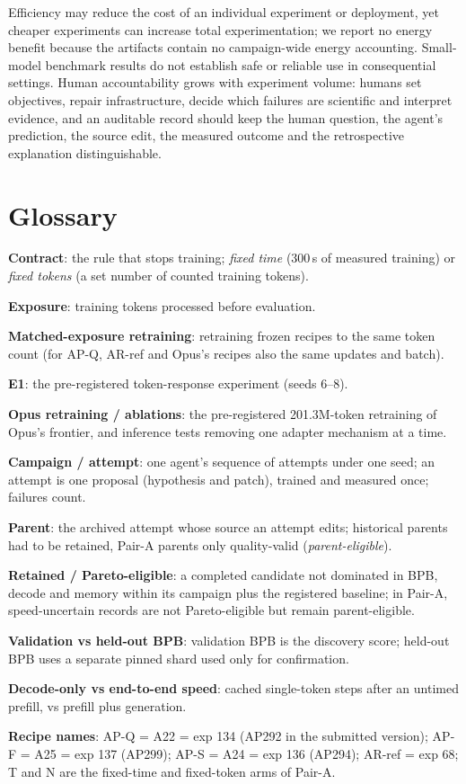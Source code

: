 \documentclass{article}
\newif\ifshowhumanmarkers \showhumanmarkersfalse
\newcommand{\humantag}[1]{{\color{humanframe}\sffamily\scriptsize\bfseries HUMAN AUTHOR MUST REWRITE/VERIFY [#1]}\ }
\newcommand{\humanauthor}[2][]{\ifshowhumanmarkers\begin{humanbox}\humantag{#1}#2\end{humanbox}\else #2\par\fi}
\begin{document}
Efficiency may reduce the cost of an individual experiment or deployment, yet cheaper experiments can increase total experimentation; we report no energy benefit because the artifacts contain no campaign-wide energy accounting. Small-model benchmark results do not establish safe or reliable use in consequential settings. Human accountability grows with experiment volume: humans set objectives, repair infrastructure, decide which failures are scientific and interpret evidence, and an auditable record should keep the human question, the agent's prediction, the source edit, the measured outcome and the retrospective explanation distinguishable.
\label{partthreeend}

\clearpage
\appendix
\raggedbottom
\section{Glossary}\label{app:glossary}
\humanauthor[P2-01 Glossary]{\textbf{Contract}: the rule that stops training; \emph{fixed time} (300\,s of measured training) or \emph{fixed tokens} (a set number of counted training tokens).\par
\textbf{Exposure}: training tokens processed before evaluation.\par
\textbf{Matched-exposure retraining}: retraining frozen recipes to the same token count (for AP-Q, AR-ref and Opus's recipes also the same updates and batch).\par
\textbf{E1}: the pre-registered token-response experiment (seeds 6--8).\par
\textbf{Opus retraining / ablations}: the pre-registered 201.3M-token retraining of Opus's frontier, and inference tests removing one adapter mechanism at a time.\par
\textbf{Campaign / attempt}: one agent's sequence of attempts under one seed; an attempt is one proposal (hypothesis and patch), trained and measured once; failures count.\par
\textbf{Parent}: the archived attempt whose source an attempt edits; historical parents had to be retained, Pair-A parents only quality-valid (\emph{parent-eligible}).\par
\textbf{Retained / Pareto-eligible}: a completed candidate not dominated in BPB, decode and memory within its campaign plus the registered baseline; in Pair-A, speed-uncertain records are not Pareto-eligible but remain parent-eligible.\par
\textbf{Validation vs held-out BPB}: validation BPB is the discovery score; held-out BPB uses a separate pinned shard used only for confirmation.\par
\textbf{Decode-only vs end-to-end speed}: cached single-token steps after an untimed prefill, vs prefill plus generation.\par
\textbf{Recipe names}: AP-Q = A22 = exp 134 (AP292 in the submitted version); AP-F = A25 = exp 137 (AP299); AP-S = A24 = exp 136 (AP294); AR-ref = exp 68; T and N are the fixed-time and fixed-token arms of Pair-A.}
\end{document}
